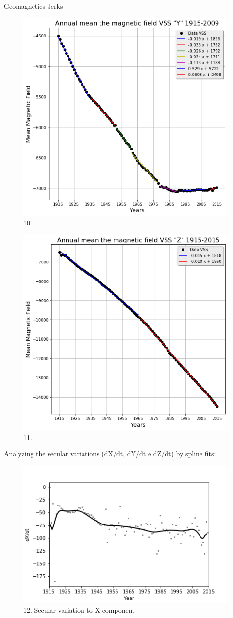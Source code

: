 \documentclass[final,t]{beamer}
\begin{document}
\begin{columns}[t]
\begin{column}{.66\linewidth}
\begin{columns}
\begin{column}{.31\linewidth}
\begin{block}{Geomagnetics Jerks}
		\begin{figure}
			\centering
			\includegraphics[width=0.5\linewidth]{retasY}
			\caption{10.}
			\label{fintetico}
		\end{figure}	
		
		
		\begin{figure}
			\centering
			\includegraphics[width=0.5\linewidth]{retasZ}
			\caption{11.}
			\label{fig:g_Sintetico}
		\end{figure}

Analyzing the secular variations (dX/dt, dY/dt e dZ/dt) by spline fits: 		
		\begin{figure}
			\centering
			\includegraphics[width=0.7\linewidth]{spline101sv_X_spline}
			\caption{12. Secular variation to X component}
			\label{SPLINEx}
		\end{figure}
		

\end{block}
\end{column}
\end{columns}
\end{column}
\end{columns}
\end{document}
